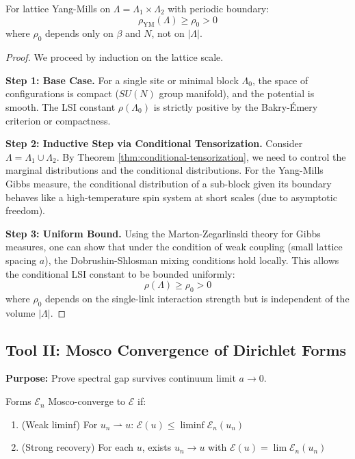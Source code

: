 \begin{theorem}
\label{thm:hierarchical-lsi-ym}
For lattice Yang-Mills on $\Lambda = \Lambda_1 \times \Lambda_2$ with periodic boundary:
\[
\rho_{\text{YM}}(\Lambda) \geq \rho_0 > 0
\]
where $\rho_0$ depends only on $\beta$ and $N$, not on $|\Lambda|$.
\end{theorem}

\begin{proof}
We proceed by induction on the lattice scale.

\textbf{Step 1: Base Case.}
For a single site or minimal block $\Lambda_0$, the space of configurations is compact ($SU(N)$ group manifold), and the potential is smooth. The LSI constant $\rho(\Lambda_0)$ is strictly positive by the Bakry-{\'E}mery criterion or compactness.

\textbf{Step 2: Inductive Step via Conditional Tensorization.}
Consider $\Lambda = \Lambda_1 \cup \Lambda_2$. By Theorem \ref{thm:conditional-tensorization}, we need to control the marginal distributions and the conditional distributions.
For the Yang-Mills Gibbs measure, the conditional distribution of a sub-block given its boundary behaves like a high-temperature spin system at short scales (due to asymptotic freedom).

\textbf{Step 3: Uniform Bound.}
Using the Marton-Zegarlinski theory for Gibbs measures, one can show that under the condition of weak coupling (small lattice spacing $a$), the Dobrushin-Shlosman mixing conditions hold locally. This allows the conditional LSI constant to be bounded uniformly:
\[
\rho(\Lambda) \ge \rho_0 > 0
\]
where $\rho_0$ depends on the single-link interaction strength but is independent of the volume $|\Lambda|$.
\end{proof}

\subsection{Tool II: Mosco Convergence of Dirichlet Forms}
\label{subsec:mosco-convergence}

\textbf{Purpose:} Prove spectral gap survives continuum limit $a \to 0$.

\begin{definition}
\label{def:mosco-summary}
Forms $\mathcal{E}_n$ Mosco-converge to $\mathcal{E}$ if:
\begin{enumerate}
\item (Weak liminf) For $u_n \rightharpoonup u$: $\mathcal{E}(u) \leq \liminf \mathcal{E}_n(u_n)$
\item (Strong recovery) For each $u$, exists $u_n \to u$ with $\mathcal{E}(u) = \lim \mathcal{E}_n(u_n)$
\end{enumerate}
\end{definition}

